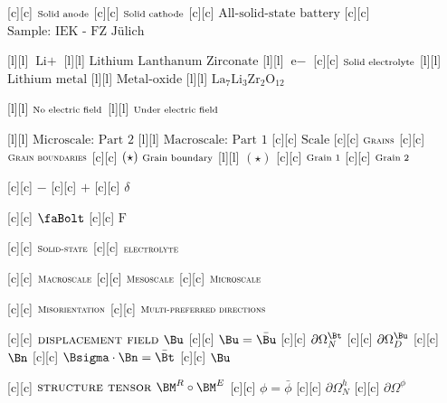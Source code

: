 [c][c] {$\text{\scriptsize Solid anode}$}
[c][c] {$\text{\scriptsize Solid cathode}$}
[c][c] {$\text{All-solid-state battery}$}
[c][c] {$\text{Sample: IEK - FZ Jülich}$}

[l][l] {$\text{Li}+$}
[l][l] {$\text{Lithium Lanthanum Zirconate}$}
[l][l] {$\text{e}-$}
[c][c] {$\text{\scriptsize Solid electrolyte}$}
[l][l] {$\text{Lithium metal}$}
[l][l] {$\text{Metal-oxide}$}
[l][l] {$\text{La}_{7}\text{Li}_{3}\text{Zr}_{2}\text{O}_{12}$}

[l][l] {$\text{\scriptsize  No electric field}$}
[l][l] {$\text{\scriptsize  Under electric field}$}

[l][l] {$\text{Microscale: Part 2}$}
[l][l] {$\text{Macroscale: Part 1}$}
[c][c] {$\text{Scale}$}
[c][c] {$\textsc{\scriptsize Grains}$}
[c][c] {$\textsc{\scriptsize Grain boundaries}$}
[c][c] {$(\star)\ \text{\scriptsize Grain boundary}$}
[l][l] {$(\star)$}
[c][c] {$\text{\scriptsize Grain 1}$}
[c][c] {$\text{\scriptsize Grain 2}$}

[c][c] {$-$}
[c][c] {$+$}
[c][c] {$\delta$}

[c][c] {$\text{\faBolt}$}
[c][c] {$\text{F}$}

[c][c] {$\textsc{\scriptsize Solid-state}$}
[c][c] {$\textsc{\scriptsize electrolyte}$}

[c][c] {$\textsc{\scriptsize Macroscale}$}
[c][c] {$\textsc{\scriptsize Mesoscale}$}
[c][c] {$\textsc{\scriptsize Microscale}$}


[c][c] {$\textsc{\scriptsize Misorientation}$}
[c][c] {$\textsc{\scriptsize Multi-preferred directions}$}

[c][c] {$\textsc{displacement field } \Bu$}
[c][c] {$\Bu=\bar{\Bu}$}
[c][c] {$\partial\Omega^{\Bt}_{N}$}
[c][c] {$\partial\Omega^{\Bu}_{D}$}
[c][c] {$\Bn$}
[c][c] {$\Bsigma\cdot\Bn = \bar{\Bt}$}
[c][c] {$\Bu$}


[c][c] {$\textsc{structure tensor } \BM^{R} \circ \BM^{E}$}
[c][c] {$\phi=\bar{\phi}$}
[c][c] {$\partial\Omega^{h}_{N}$}
[c][c] {$\partial\Omega^{\phi}$}

